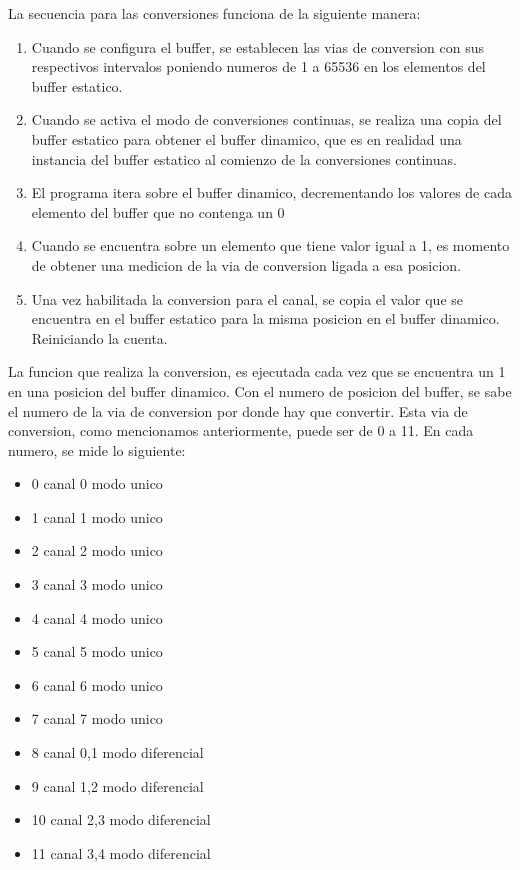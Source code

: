 La secuencia para las conversiones funciona de la siguiente manera:

\begin{enumerate}
\item Cuando se configura el buffer, se establecen las vias de conversion con sus respectivos intervalos poniendo numeros de 1 a 65536 en los elementos del buffer estatico.
\item Cuando se activa el modo de conversiones continuas, se realiza una copia del buffer estatico para obtener el buffer dinamico, que es en realidad una instancia del buffer estatico al comienzo de la conversiones continuas.
\item El programa itera sobre el buffer dinamico, decrementando los valores de cada elemento del buffer que no contenga un 0
\item Cuando se encuentra sobre un elemento que tiene valor igual a 1, es momento de obtener una medicion de la via de conversion ligada a esa posicion.
\item Una vez habilitada la conversion para el canal, se copia el valor que se encuentra en el buffer estatico para la misma posicion en el buffer dinamico. Reiniciando la cuenta.
\end{enumerate}

La funcion que realiza la conversion, es ejecutada cada vez que se encuentra un 1 en una posicion del buffer dinamico. Con el numero de posicion del buffer, se sabe el numero de la via de conversion por donde hay que convertir. Esta via de conversion, como mencionamos anteriormente, puede ser de 0 a 11. En cada numero, se mide lo siguiente:

\begin{itemize}
\item 0 \textrightarrow  canal 0 modo unico
\item 1 \textrightarrow  canal 1 modo unico
\item 2 \textrightarrow  canal 2 modo unico
\item 3 \textrightarrow  canal 3 modo unico
\item 4 \textrightarrow  canal 4 modo unico
\item 5 \textrightarrow  canal 5 modo unico
\item 6 \textrightarrow  canal 6 modo unico
\item 7 \textrightarrow  canal 7 modo unico
\item 8 \textrightarrow  canal 0,1 modo diferencial
\item 9 \textrightarrow  canal 1,2 modo diferencial
\item 10 \textrightarrow  canal 2,3 modo diferencial
\item 11 \textrightarrow  canal 3,4 modo diferencial
\end{itemize}

